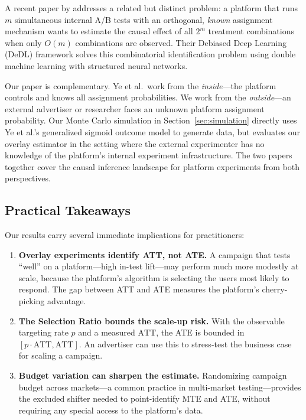 \documentclass[12pt]{article}
\newcommand{\ATT}{\mathrm{ATT}}
\begin{document}
A recent paper by \citet{ye2025deep} addresses a related but distinct
problem: a platform that runs $m$ simultaneous internal A/B tests with an
orthogonal, \emph{known} assignment mechanism wants to estimate the causal
effect of all $2^m$ treatment combinations when only $O(m)$ combinations
are observed. Their Debiased Deep Learning (DeDL) framework solves this
combinatorial identification problem using double machine learning with
structured neural networks.

Our paper is complementary. Ye et al.\ work from the \emph{inside}---the
platform controls and knows all assignment probabilities. We work from the
\emph{outside}---an external advertiser or researcher faces an unknown
platform assignment probability. Our Monte Carlo simulation in
Section~\ref{sec:simulation} directly uses Ye et al.'s generalized sigmoid
outcome model to generate data, but evaluates our overlay estimator in the
setting where the external experimenter has no knowledge of the platform's
internal experiment infrastructure. The two papers together cover the
causal inference landscape for platform experiments from both perspectives.

\subsection*{Practical Takeaways}

Our results carry several immediate implications for practitioners:
\begin{enumerate}
  \item \textbf{Overlay experiments identify ATT, not ATE.} A campaign
    that tests ``well'' on a platform---high in-test lift---may perform
    much more modestly at scale, because the platform's algorithm is
    selecting the users most likely to respond. The gap between ATT and ATE
    measures the platform's cherry-picking advantage.
  \item \textbf{The Selection Ratio bounds the scale-up risk.} With the
    observable targeting rate $p$ and a measured $\ATT$, the ATE is bounded
    in $[p \cdot \ATT, \ATT]$. An advertiser can use this to stress-test
    the business case for scaling a campaign.
  \item \textbf{Budget variation can sharpen the estimate.} Randomizing
    campaign budget across markets---a common practice in multi-market
    testing---provides the excluded shifter needed to point-identify MTE
    and ATE, without requiring any special access to the platform's data.
\end{enumerate}
\end{document}
